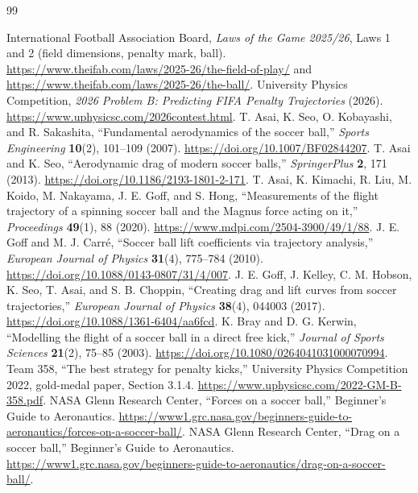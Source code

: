 \documentclass[11pt,a4paper]{article}
\begin{document}
\begin{thebibliography}{99}
 International Football Association Board, \emph{Laws of the Game 2025/26}, Laws 1 and 2 (field dimensions, penalty mark, ball). \url{https://www.theifab.com/laws/2025-26/the-field-of-play/} and \url{https://www.theifab.com/laws/2025-26/the-ball/}.
 University Physics Competition, \emph{2026 Problem B: Predicting FIFA Penalty Trajectories} (2026). \url{https://www.uphysicsc.com/2026contest.html}.
 T. Asai, K. Seo, O. Kobayashi, and R. Sakashita, ``Fundamental aerodynamics of the soccer ball,'' \emph{Sports Engineering} \textbf{10}(2), 101--109 (2007). \url{https://doi.org/10.1007/BF02844207}.
 T. Asai and K. Seo, ``Aerodynamic drag of modern soccer balls,'' \emph{SpringerPlus} \textbf{2}, 171 (2013). \url{https://doi.org/10.1186/2193-1801-2-171}.
 T. Asai, K. Kimachi, R. Liu, M. Koido, M. Nakayama, J. E. Goff, and S. Hong, ``Measurements of the flight trajectory of a spinning soccer ball and the Magnus force acting on it,'' \emph{Proceedings} \textbf{49}(1), 88 (2020). \url{https://www.mdpi.com/2504-3900/49/1/88}.
 J. E. Goff and M. J. Carr\'e, ``Soccer ball lift coefficients via trajectory analysis,'' \emph{European Journal of Physics} \textbf{31}(4), 775--784 (2010). \url{https://doi.org/10.1088/0143-0807/31/4/007}.
 J. E. Goff, J. Kelley, C. M. Hobson, K. Seo, T. Asai, and S. B. Choppin, ``Creating drag and lift curves from soccer trajectories,'' \emph{European Journal of Physics} \textbf{38}(4), 044003 (2017). \url{https://doi.org/10.1088/1361-6404/aa6fcd}.
 K. Bray and D. G. Kerwin, ``Modelling the flight of a soccer ball in a direct free kick,'' \emph{Journal of Sports Sciences} \textbf{21}(2), 75--85 (2003). \url{https://doi.org/10.1080/0264041031000070994}.
 Team 358, ``The best strategy for penalty kicks,'' University Physics Competition 2022, gold-medal paper, Section 3.1.4. \url{https://www.uphysicsc.com/2022-GM-B-358.pdf}.
 NASA Glenn Research Center, ``Forces on a soccer ball,'' Beginner's Guide to Aeronautics. \url{https://www1.grc.nasa.gov/beginners-guide-to-aeronautics/forces-on-a-soccer-ball/}.
 NASA Glenn Research Center, ``Drag on a soccer ball,'' Beginner's Guide to Aeronautics. \url{https://www1.grc.nasa.gov/beginners-guide-to-aeronautics/drag-on-a-soccer-ball/}.

\end{thebibliography}
\end{document}
